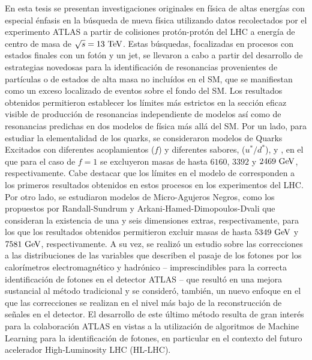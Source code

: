En esta tesis se presentan investigaciones originales en física de altas energías con especial énfasis en la búsqueda de nueva física utilizando datos recolectados por el experimento \acs{ATLAS} a partir de colisiones protón-protón del \ac{LHC} a energía de centro de masa de \(\sqrt{s} = 13~\text{TeV}\). Estas búsquedas, focalizadas en procesos con estados finales con un fotón y un jet, se llevaron a cabo a partir del desarrollo de estrategias novedosas para la identificación de resonancias provenientes de partículas o de estados de alta masa no incluídos en el \ac{SM}, que se manifiestan como un exceso localizado de eventos sobre el fondo del \ac{SM}. Los resultados obtenidos permitieron establecer los límites más estrictos en la sección eficaz visible de producción de resonancias independiente de modelos así como de resonancias predichas en dos modelos de física más allá del \ac{SM}. Por un lado, para estudiar la elementalidad de los quarks, se consideraron modelos de Quarks Excitados con diferentes acoplamientos (\(f\)) y diferentes sabores, \qstar (\(u^*/d^*\)), \cstar y \bstar, en el que para el caso de \(f = 1\) se excluyeron masas de hasta \(6160\), \(3392\) y \(2469~\text{GeV}\), respectivamente. Cabe destacar que los límites en el modelo de \cstar  corresponden a los primeros resultados obtenidos en estos procesos en los experimentos del \ac{LHC}. Por otro lado, se estudiaron modelos de Micro-Agujeros Negros, como los propuestos por Randall-Sundrum y Arkani-Hamed-Dimopoulos-Dvali que consideran la existencia de una y seis dimensiones extras, respectivamente, para los que los resultados obtenidos permitieron excluir masas de hasta \(5349~\text{GeV}\) y \(7581~\text{GeV}\), respectivamente. A su vez, se realizó un estudio sobre las correcciones a las distribuciones de las variables que describen el pasaje de los fotones por los calorímetros electromagnético y hadrónico -- imprescindibles para la correcta identificación de fotones en el detector \ac{ATLAS} -- que resultó en una mejora sustancial al método tradicional y se consideró, también, un nuevo enfoque en el que las correcciones se realizan en el nivel más bajo de la reconstrucción de señales en el detector. El desarrollo de este último método resulta de gran interés para la colaboración \ac{ATLAS} en vistas a la utilización de algoritmos de Machine Learning para la identificación de fotones, en particular en el contexto del futuro acelerador High-Luminosity \ac{LHC} (HL-LHC).


\noindent 

